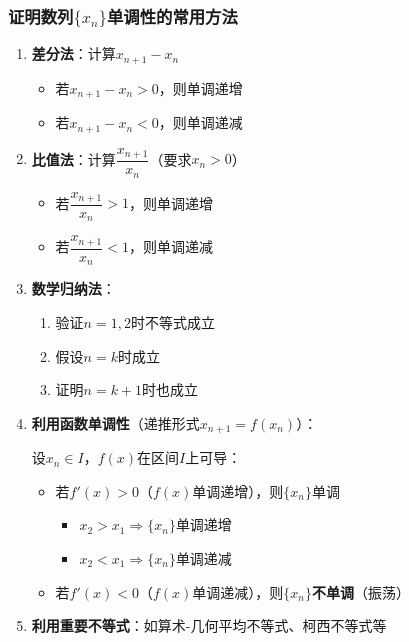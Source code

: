 \documentclass[a4paper,12pt]{article}
\begin{document}
    \subsubsection{证明数列$\{x_n\}$单调性的常用方法}
    \begin{enumerate}
        \item \textbf{差分法}：计算$x_{n+1} - x_n$
        \begin{itemize}
            \item 若$x_{n+1} - x_n > 0$，则单调递增
            \item 若$x_{n+1} - x_n < 0$，则单调递减
        \end{itemize}

        \item \textbf{比值法}：计算$\dfrac{x_{n+1}}{x_n}$（要求$x_n > 0$）
        \begin{itemize}
            \item 若$\dfrac{x_{n+1}}{x_n} > 1$，则单调递增
            \item 若$\dfrac{x_{n+1}}{x_n} < 1$，则单调递减
        \end{itemize}

        \item \textbf{数学归纳法}：
        \begin{enumerate}
            \item 验证$n=1, 2$时不等式成立
            \item 假设$n=k$时成立
            \item 证明$n=k+1$时也成立
        \end{enumerate}

        \item \textbf{利用函数单调性}（递推形式$x_{n+1} = f(x_n)$）：

        设$x_n \in I$，$f(x)$在区间$I$上可导：
        \begin{itemize}
            \item 若$f'(x) > 0$（$f(x)$单调递增），则$\{x_n\}$单调
            \begin{itemize}
                \item $x_2 > x_1 \Rightarrow \{x_n\}$单调递增
                \item $x_2 < x_1 \Rightarrow \{x_n\}$单调递减
            \end{itemize}
            \item 若$f'(x) < 0$（$f(x)$单调递减），则$\{x_n\}$\textbf{不单调}（振荡）
        \end{itemize}

        \item \textbf{利用重要不等式}：如算术-几何平均不等式、柯西不等式等
    \end{enumerate}
\end{document}
